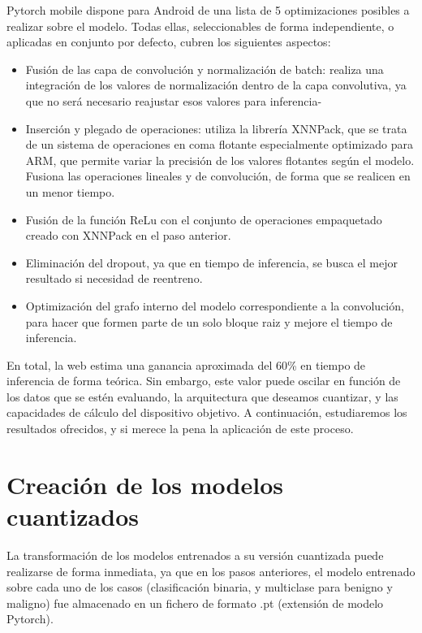 Pytorch mobile dispone para Android de una lista de 5 optimizaciones posibles a realizar sobre el modelo. Todas ellas, seleccionables de forma independiente, o aplicadas en conjunto por defecto, cubren los siguientes aspectos:

\begin{itemize}
	\item Fusión de las capa de convolución y normalización de batch: realiza una integración de los valores de normalización dentro de la capa convolutiva, ya que no será necesario reajustar esos valores para inferencia-
	\item Inserción y plegado de operaciones: utiliza la librería XNNPack, que se trata de un sistema de operaciones en coma flotante especialmente optimizado para ARM, que permite variar la precisión de los valores flotantes según el modelo. Fusiona las operaciones lineales y de convolución, de forma que se realicen en un menor tiempo.
	\item Fusión de la función ReLu con el conjunto de operaciones empaquetado creado con XNNPack en el paso anterior.
	\item Eliminación del dropout, ya que en tiempo de inferencia, se busca el mejor resultado si necesidad de reentreno.
	\item Optimización del grafo interno del modelo correspondiente a la convolución, para hacer que formen parte de un solo bloque raiz y mejore el tiempo de inferencia.	
\end{itemize}

En total, la web  \cite{pmobile} estima una ganancia aproximada del 60\% en tiempo de inferencia de forma teórica. Sin embargo, este valor puede oscilar en función de los datos que se estén evaluando, la arquitectura que deseamos cuantizar, y las capacidades de cálculo del dispositivo objetivo. A continuación, estudiaremos los resultados ofrecidos, y si merece la pena la aplicación de este proceso.

\section{Creación de los modelos cuantizados}

La transformación de los modelos entrenados a su versión cuantizada puede realizarse de forma inmediata, ya que en los pasos anteriores, el modelo entrenado sobre cada uno de los casos (clasificación binaria, y multiclase para benigno y maligno) fue almacenado en un fichero de formato .pt (extensión de modelo Pytorch).

